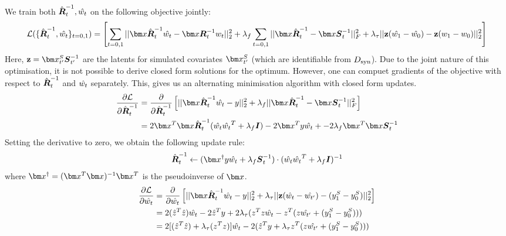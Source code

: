 \subsubsection{\our}
\label{app:linear:altmin}
We train both $\hat{\boldsymbol{R}}^{-1}_t, \hat{w_{t}}$ on the following objective jointly:
\begin{align*}
    \mathcal{L}(\{\hat{\mat{R}}^{-1}_t, \hat{\wbeta{t}}\}_{t=0,1}) = \left[\sum_{t=0,1}||\xb \hat{\mat{R}}^{-1}_t\hat{\wbeta{t}} - \xb\mat{R}^{-1}_t\wbeta{t}||_2^2 + \Lphi\sum_{t=0,1}||\xb \hat{\mat{R}}^{-1}_t - \xb \mat{S}^{-1}_t||_{F}^2 + \Ltau||\mathbf{z}(\hat{\wbeta{1}} - \hat{\wbeta{0}}) - \mathbf{z}(\wbeta{1} - \wbeta{0})||_2^2\right]
\end{align*}
Here, $\mathbf{z} = \xb^S_{t'} \mat{S}^{-1}_{t'}$ are the latents for simulated covariates $\xb^S_{t'}$ (which are identifiable from $D_{\text{syn}}$). Due to the joint nature of this optimisation, it is not possible to derive closed form solutions for the optimum. However, one can compuet gradients of the objective with respect to $\hat{\boldsymbol{R}}^{-1}_t$ and $ \hat{w_{t}}$ separately. This, gives us an alternating minimisation algorithm with closed form updates.
% 
\begin{align*}
    \frac{\partial \mathcal{L}}{\partial \hat{\mat{R}}^{-1}_t} &= \frac{\partial}{\partial \hat{\mat{R}}^{-1}_t}\left[||\xb \hat{\mat{R}}^{-1}_t\hat{\wbeta{t}} - y||_2^2 + \Lphi||\xb \hat{\mat{R}}^{-1}_t - \xb \mat{S}^{-1}_t||_{F}^2\right]\\
    &=  2\xb^T\xb \hat{\mat{R}}^{-1}_t (\hat{\wbeta{t}}\hat{\wbeta{t}}^T + \Lphi\mat{I}) - 2\xb^T y\hat{\wbeta{t}} + -2\Lphi \xb^T\xb\mat{S}^{-1}_t 
\end{align*}
Setting the derivative to zero, we obtain the following update rule:
\begin{align*}
    \hat{\mat{R}}^{-1}_t \leftarrow (\xb^{\dag}y\hat{\wbeta{t}} + \Lphi \mat{S}^{-1}_t) \cdot (\hat{\wbeta{t}}\hat{\wbeta{t}}^T + \Lphi\mat{I})^{-1}
\end{align*}
where $\xb^{\dag} = (\xb^T\xb)^{-1}\xb^T$ is the pseudoinverse of $\xb$.
\begin{align*}
    \frac{\partial \mathcal{L}}{\partial \hat{\wbeta{t}}} &= \frac{\partial}{\partial \hat{\wbeta{t}}}
    \left[||\xb \hat{\mat{R}}^{-1}_t\hat{\wbeta{t}} - y||_2^2 + \Ltau||\mathbf{z}(\hat{\wbeta{t}} - \hat{\wbeta{t'}}) - (y_1^S - y_0^S)||_2^2\right]\\
    &= 2(\hat{z}^T\hat{z})\hat{\wbeta{t}}- 2\hat{z}^Ty + 2\Ltau(z^Tz\hat{\wbeta{t}} - z^T(z\hat{\wbeta{t'}} + (y_1^S - y_0^S)))\\
    &= 2[(\hat{z}^T\hat{z}) + \Ltau(z^Tz)]\hat{\wbeta{t}} - 2(\hat{z}^Ty + \Ltau z^T(z\hat{\wbeta{t'}} + (y_1^S - y_0^S))) 
\end{align*}
